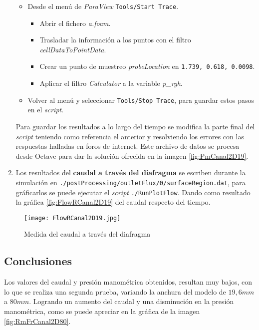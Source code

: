 \begin{enumerate}
  \begin{itemize}
  \item
    Desde el menú de \emph{ParaView} \lstinline[style=bash]{Tools/Start Trace}.

    \begin{itemize}
    \item
      Abrir el fichero \emph{a.foam}.
    \item
      Trasladar la información a los puntos con el filtro
      \emph{cellDataToPointData}.
    \item
      Crear un punto de muestreo \emph{probeLocation} en \lstinline[style=bash]{1.739, 0.618, 0.0098}.
    \item
      Aplicar el filtro \emph{Calculator} a la variable \emph{p\_rgh}.
    \end{itemize}
  \item
    Volver al menú y seleccionar \lstinline[style=bash]{Tools/Stop Trace}, para guardar
    estos pasos en el \emph{script}.
  \end{itemize}

  Para guardar los resultados a lo largo del tiempo se modifica la parte
  final del \emph{script} teniendo como referencia el anterior y
  resolviendo los errores con las respuestas halladas en foros de internet. Este archivo de datos se procesa desde Octave para dar la solución ofrecida en la imagen \autoref{fig:PmCanal2D19}.

\item
  Los resultados del \textbf{caudal a través del diafragma} se escriben durante
  la simulación en
  \lstinline[style=bash]{./postProcessing/outletFlux/0/surfaceRegion.dat},
  para gráficarlos se puede ejecutar el \emph{script}
  \lstinline[style=bash]{./RunPlotFlow}. 
  Dando como resultado la gráfica \autoref{fig:FlowRCanal2D19} del caudal respecto del tiempo.
\end{enumerate}

\begin{figure}
\centering
\texttt{[image: FlowRCanal2D19.jpg]}
\caption{Medida del caudal a través del diafragma}
\label{fig:FlowRCanal2D19}
\end{figure}

\subsection{Conclusiones}\label{header-n245}

Los valores del caudal y presión manométrica obtenidos, resultan muy
bajos, con lo que se realiza una segunda prueba, variando la anchura del
modelo de \(19,6 mm\) a \(80 mm\). Logrando un aumento del caudal y una
disminución en la presión manométrica, como se puede apreciar en la
gráfica de la imagen \autoref{fig:RmFrCanal2D80}.

